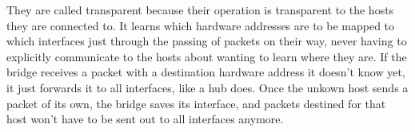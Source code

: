 They are called transparent because their operation is transparent to the hosts they are connected to. It learns which hardware addresses are to be mapped to which interfaces just through the passing of packets on their way, never having to explicitly communicate to the hosts about wanting to learn where they are. If the bridge receives a packet with a destination hardware address it doesn't know yet, it just forwards it to all interfaces, like a hub does. Once the unkown host sends a packet of its own, the bridge saves its interface, and packets destined for that host won't have to be sent out to all interfaces anymore.
